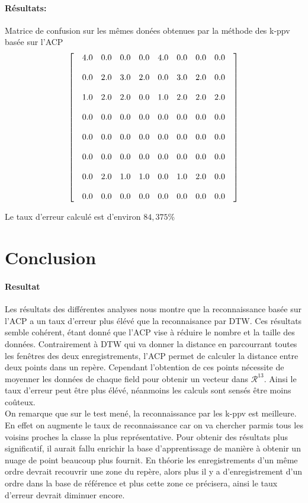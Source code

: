 \documentclass[a4paper,12pt]{report}
\begin{document}
\paragraph{Résultats:\\}
Matrice de confusion sur les mêmes donées obtenues par  la méthode des k-ppv basée sur l'ACP
\[
\begin{bmatrix}
  & 4.0 & 0.0 & 0.0 & 0.0  & 4.0 & 0.0 & 0.0 & 0.0 &  \cr \\
  & 0.0 & 2.0 & 3.0 & 2.0  & 0.0 & 3.0 & 2.0 & 0.0 &  \cr \\
  & 1.0 & 2.0 & 2.0 & 0.0  & 1.0 & 2.0 & 2.0 & 2.0 &  \cr \\
  & 0.0 & 0.0 & 0.0 & 0.0  & 0.0 & 0.0 & 0.0 & 0.0 &  \cr \\
  & 0.0 & 0.0 & 0.0 & 0.0  & 0.0 & 0.0 & 0.0 & 0.0 &  \cr \\
  & 0.0 & 0.0 & 0.0 & 0.0  & 0.0 & 0.0 & 0.0 & 0.0 &  \cr \\
  & 0.0 & 2.0 & 1.0 & 1.0  & 0.0 & 1.0 & 2.0 & 0.0 &  \cr \\
  & 0.0 & 0.0 & 0.0 & 0.0  & 0.0 & 0.0 & 0.0 & 0.0 &   
\end{bmatrix}
\]

Le taux d'erreur calculé est d'environ $84,375\%$\\

\newpage
\section{Conclusion}
\paragraph{Resultat\\}
Les résultats des différentes analyses nous montre que la reconnaissance basée sur l'ACP a un taux d'erreur plus élévé que la reconnaisance par DTW. Ces résultats semble cohérent, étant donné que l'ACP vise à réduire le nombre et la taille des données. Contrairement à DTW qui va donner la distance en parcourrant toutes les fenêtres des deux enregistrements, l'ACP permet de calculer la distance entre deux points dans un repère. Cependant l'obtention de ces points nécessite de moyenner les données de chaque field pour obtenir un vecteur dans $\mathcal{R}^{13}$. Ainsi le taux d'erreur peut être plus élévé, néanmoins les calculs sont sensés être moins coûteux. \\
On remarque que sur le test mené, la reconnaissance par les k-ppv est meilleure. En effet on augmente le taux de reconnaissance car on va chercher parmis tous les voisins proches la classe la plus représentative. 
Pour obtenir des résultats plus significatif, il aurait fallu enrichir la base d'apprentissage de manière à obtenir un nuage de point beaucoup plus fournit. En théorie les enregistrements d'un même ordre devrait recouvrir une zone du repère, alors plus il y a d'enregistrement d'un ordre dans la base de référence et plus cette zone ce précisera, ainsi le taux d'erreur devrait diminuer encore.\\
\end{document}
